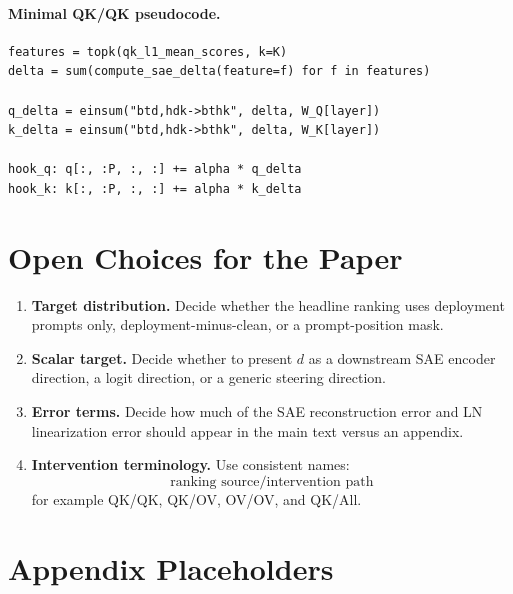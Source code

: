 \documentclass[11pt]{article}
\theoremstyle{definition}
\theoremstyle{plain}
\theoremstyle{remark}
\begin{document}
\paragraph{Minimal QK/QK pseudocode.}
\begin{verbatim}
features = topk(qk_l1_mean_scores, k=K)
delta = sum(compute_sae_delta(feature=f) for f in features)

q_delta = einsum("btd,hdk->bthk", delta, W_Q[layer])
k_delta = einsum("btd,hdk->bthk", delta, W_K[layer])

hook_q: q[:, :P, :, :] += alpha * q_delta
hook_k: k[:, :P, :, :] += alpha * k_delta
\end{verbatim}

\section{Open Choices for the Paper}

\begin{enumerate}[leftmargin=*]
  \item \textbf{Target distribution.}
  Decide whether the headline ranking uses deployment prompts only,
  deployment-minus-clean, or a prompt-position mask.

  \item \textbf{Scalar target.}
  Decide whether to present \(d\) as a downstream SAE encoder direction, a logit
  direction, or a generic steering direction.

  \item \textbf{Error terms.}
  Decide how much of the SAE reconstruction error and LN linearization error
  should appear in the main text versus an appendix.

  \item \textbf{Intervention terminology.}
  Use consistent names:
  \[
    \text{ranking source} / \text{intervention path}
  \]
  for example QK/QK, QK/OV, OV/OV, and QK/All.
\end{enumerate}

\appendix
\section{Appendix Placeholders}
\end{document}
